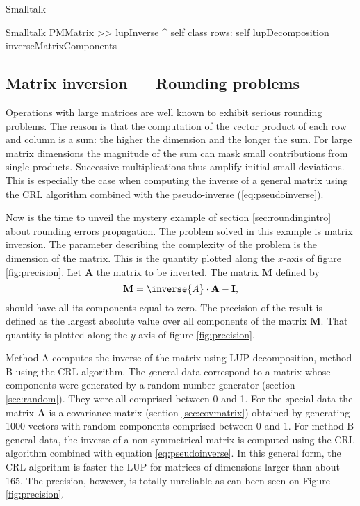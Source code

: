 \begin{displaycode}{Smalltalk}
\begin{displaycode}{Smalltalk}
PMMatrix >> lupInverse
    ^ self class rows: self lupDecomposition inverseMatrixComponents
\end{displaycode}

\subsection{Matrix inversion --- Rounding problems}
\label{sec:matrixrounding} Operations with large matrices are well
known to exhibit serious rounding problems. The reason is that the
computation of the vector product of each row and column is a sum:
the higher the dimension and the longer the sum. For large matrix
dimensions the magnitude of the sum can mask small contributions
from single products. Successive multiplications thus amplify
initial small deviations. This is especially the case when
computing the inverse of a general matrix using the CRL algorithm
combined with the pseudo-inverse (\ref{eq:pseudoinverse}).

Now is the time to unveil the mystery example of section
\ref{sec:roundingintro} about rounding errors propagation. The
problem solved in this example is matrix inversion. The parameter
describing the complexity of the problem is the dimension of the
matrix. This is the quantity plotted along the $x$-axis of figure
\ref{fig:precision}. Let $\textbf{A}$ the matrix to be inverted. The
matrix $\textbf{M}$ defined by
\begin{equation}
  \textbf{M}=\inverse{A}\cdot\textbf{A}-\textbf{I},
\end{equation}
should have all its components equal to zero. The precision of the
result is defined as the largest absolute value over all
components of the matrix $\textbf{M}$. That quantity is plotted along
the $y$-axis of figure \ref{fig:precision}.

Method A computes the inverse of the matrix using LUP
decomposition, method B using the CRL algorithm. The {\textsl general}
data correspond to a matrix whose components were generated by a
random number generator (\cf section \ref{sec:random}). They were
all comprised between 0 and 1. For the {\textsl special} data the
matrix $\textbf{A}$ is a covariance matrix (\cf section
\ref{sec:covmatrix}) obtained by generating 1000 vectors with
random components comprised between 0 and 1. For method B general
data, the inverse of a non-symmetrical matrix is computed using
the CRL algorithm combined with equation \ref{eq:pseudoinverse}.
In this general form, the CRL algorithm is faster the LUP for
matrices of dimensions larger than about 165. The precision,
however, is totally unreliable as can been seen on Figure
\ref{fig:precision}.


\end{displaycode}
